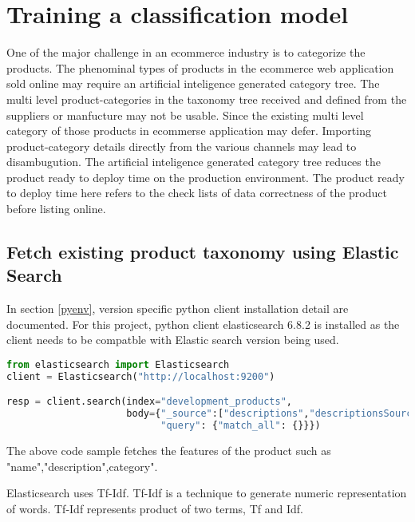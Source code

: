 
\chapter{Training a classification model}

One of the major challenge in an ecommerce industry is to categorize the products. The phenominal types of products in the ecommerce web application sold online may require an artificial inteligence generated category tree. The multi level product-categories in the taxonomy tree received and defined from the suppliers or manfucture may not be usable. Since the existing multi level category of those products in ecommerse application may defer. Importing product-category details directly from the various channels may lead to disambugution. The artificial inteligence generated category tree reduces the product ready to deploy time on the production environment. The product ready to deploy time here refers to the check lists of data correctness of the product before listing online.

\section {Fetch existing product taxonomy using Elastic Search}

In section \ref {pyenv}, version specific python client installation detail are documented. For this project, python client elasticsearch 6.8.2 is installed as the client needs to be compatble with Elastic search version being used.


\begin{lstlisting}[language=Python]
from elasticsearch import Elasticsearch
client = Elasticsearch("http://localhost:9200")

resp = client.search(index="development_products",
                     body={"_source":["descriptions","descriptionsSource","nameSource","shortDescriptionSource","categoriesSource"],
                           "query": {"match_all": {}}})
\end{lstlisting}

The above code sample fetches the features of the product such as "name","description",category".


Elasticsearch uses \acf{Tf-Idf}. \acs{Tf-Idf} is a technique to generate numeric representation of words. \acs{Tf-Idf} represents product of two terms, \acs{Tf} and \acs{Idf}.




